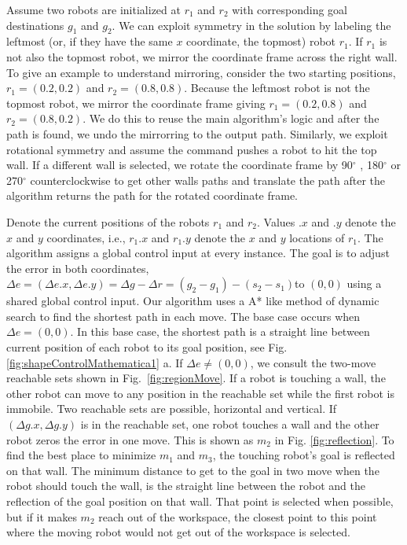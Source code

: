 Assume two robots are initialized at $r_1$ and $r_2$ with corresponding goal destinations $g_1$ and $g_2$. 
We can exploit symmetry in the solution by labeling the leftmost  (or, if they have the same $x$ coordinate, the topmost) robot $r_1$.  If $r_1$ is not also the topmost robot, we mirror the coordinate frame across the right wall. To give an example to understand mirroring, consider the two starting positions, $r_1 =  (0.2, 0.2) $ and $r_2 = (0.8, 0.8)$. Because the leftmost robot is not the topmost robot, we mirror the coordinate frame giving $r_1 = (0.2, 0.8)$ and $r_2 = (0.8,0.2)$. We do this to reuse the main algorithm's logic and after the path is found, we undo the mirrorring to the output path. Similarly, we exploit rotational symmetry and assume the command pushes a robot to hit the top wall. If a different wall is selected, we rotate the coordinate frame by 90$^{\circ}$ , 180$^{\circ}$  or 270$^{\circ}$ counterclockwise to get other walls paths and translate the path after the algorithm returns the path for the rotated coordinate frame.

Denote the current positions of the robots  $r_1$ and $r_2$. 
Values $.x$ and $.y$ denote the $x$ and $y$ coordinates, i.e., $r_1.x$ and $r_1.y$ denote the $x$ and $y$ locations of $r_1$. 
The algorithm assigns a global control input at every instance.
The goal is to adjust the error in both coordinates,
 $\Delta e =(\Delta e.x, \Delta e.y) =\Delta g - \Delta r = (g_2-g_1)- (s_2-s_1)$to $(0,0)$ using a shared global control input. 
Our algorithm uses a A* like method of dynamic search to find the shortest path in each move. The base case occurs when $\Delta e= (0,0)$. In this base case, the shortest path is a straight line between current position of each robot to its goal position, see Fig. \ref{fig:shapeControlMathematica1} a.  
If  $\Delta e\neq (0,0)$, we consult the two-move reachable sets shown in Fig.~\ref{fig:regionMove}. If a robot is touching a wall, the other robot can move to any position in the reachable set while the first robot is immobile. 
Two reachable sets are possible, horizontal and vertical. 
If $(\Delta g.x, \Delta g.y)$ is in the reachable set, one robot touches a wall and the other robot zeros the error in one move. This is shown as $m_2$ in Fig. \ref{fig:reflection}. To find the best place to minimize $m_1$ and $m_3$, the touching robot's goal is reflected on that wall. The minimum distance to get to the goal in two move when the robot should touch the wall, is the straight line between the robot and the reflection of the goal position on that wall. 
That point is selected when possible, but if it makes $m_2$ reach out of the workspace, the closest point to this point where the moving robot would not get out of the workspace is selected.


